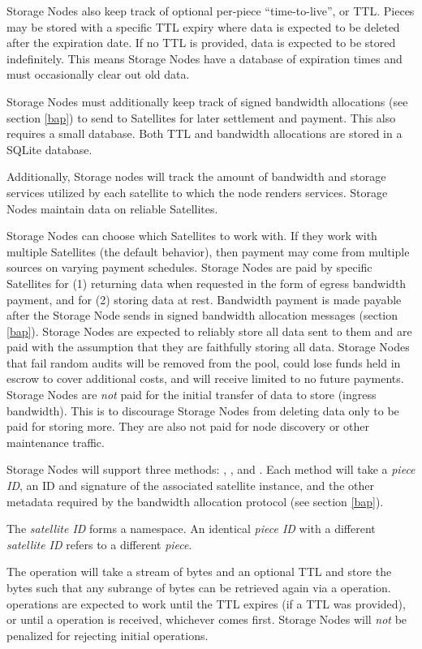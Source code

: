 \documentclass[8pt,fleqn,openany]{book}
\begin{document}
Storage Nodes also keep track of optional per-piece ``time-to-live'', or TTL.
Pieces may be stored with a specific TTL expiry where data is expected to
be deleted after the expiration date. If no TTL is provided, data is expected
to be stored indefinitely. This means Storage Nodes have a database of
expiration
times and must occasionally clear out old data.

Storage Nodes must additionally keep track of signed bandwidth allocations
(see section \ref{bap}) to send to
Satellites for later settlement and payment. This also requires a small
database. Both TTL and bandwidth allocations are stored in a SQLite
\cite{sqlite} database.

Additionally, Storage nodes will track the amount of bandwidth and storage services utilized by each satellite to which the node renders services. Storage Nodes maintain data on reliable Satellites.

Storage Nodes can choose which Satellites to work with. If they work
with multiple Satellites (the default behavior), then payment may come from
multiple sources on varying payment schedules.
Storage Nodes are paid by specific Satellites for (1) returning data when
requested in
the form of egress bandwidth payment, and for (2) storing data at rest.
Bandwidth payment is made payable after
the Storage Node sends in signed bandwidth allocation messages
(section \ref{bap}).
Storage Nodes are expected to reliably store all data sent to them and are
paid
with the assumption that they are faithfully storing all data.
Storage Nodes that fail random audits will be removed from the pool, could lose funds held in escrow to cover additional costs, and will
receive
limited to no future payments.
Storage Nodes are {\em not} paid for the initial transfer of data to store
(ingress
bandwidth). This is to discourage Storage Nodes from deleting data only to be
paid for
storing more. They are also not paid for node discovery or other
maintenance traffic.

Storage Nodes will support three methods: , , and
.
Each method will take a {\em piece ID}, an ID and signature of the associated
satellite instance, and the other metadata required by the
bandwidth allocation protocol (see section \ref{bap}).

The {\em satellite ID} forms a namespace. An identical {\em piece ID} with a
different {\em satellite ID} refers to a different {\em piece}.

The  operation will take a stream of bytes and an optional TTL and
store the bytes such
that any subrange of bytes can be retrieved again via a  operation.
 operations are expected to work until the TTL expires (if a TTL was
provided), or until a  operation is received, whichever comes
first.
Storage
Nodes will {\em not} be penalized for rejecting initial  operations.
\end{document}

